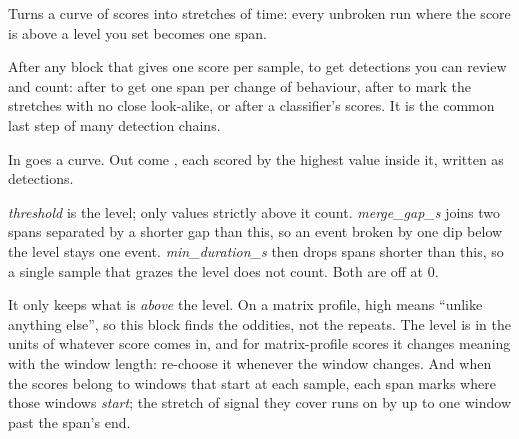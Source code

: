 Turns a curve of scores into stretches of time: every unbroken run where the score is above a
level you set becomes one span.

After any block that gives one score per sample, to get detections you can review and count: after
 to get one span per change of behaviour, after
 to mark the stretches with no close look-alike, or after a
classifier's scores. It is the common last step of many detection chains.

In goes a  curve. Out come , each scored by the highest
value inside it, written as detections.

\emph{threshold} is the level; only values strictly above it count. \emph{merge\_gap\_s} joins two
spans separated by a shorter gap than this, so an event broken by one dip below the level stays
one event. \emph{min\_duration\_s} then drops spans shorter than this, so a single sample that
grazes the level does not count. Both are off at 0.

It only keeps what is \emph{above} the level. On a matrix profile, high means ``unlike anything
else'', so this block finds the oddities, not the repeats. The level is in the units of whatever
score comes in, and for matrix-profile scores it changes meaning with the window length: re-choose
it whenever the window changes. And when the scores belong to windows that start at each sample,
each span marks where those windows \emph{start}; the stretch of signal they cover runs on by up to
one window past the span's end.
